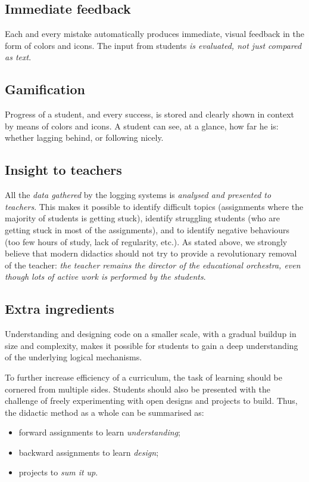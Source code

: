 \subsection{Immediate feedback}
Each and every mistake automatically produces immediate, visual feedback in the form of colors and icons. The input from students \textit{is evaluated, not just compared as text}.

\subsection{Gamification}
Progress of a student, and every success, is stored and clearly shown in context by means of colors and icons. A student can see, at a glance, how far he is: whether lagging behind, or following nicely.

\subsection{Insight to teachers}
All the \textit{data gathered} by the logging systems is \textit{analysed and presented to teachers}. This makes it possible to identify difficult topics (assignments where the majority of students is getting stuck), identify struggling students (who are getting stuck in most of the assignments), and to identify negative behaviours (too few hours of study, lack of regularity, etc.). As stated above, we strongly believe that modern didactics should not try to provide a revolutionary removal of the teacher: \textit{the teacher remains the director of the educational orchestra, even though lots of active work is performed by the students}.

\subsection{Extra ingredients}
Understanding and designing code on a smaller scale, with a gradual buildup in size and complexity, makes it possible for students to gain a deep understanding of the underlying logical mechanisms.

To further increase efficiency of a curriculum, the task of learning should be cornered from multiple sides. Students should also be presented with the challenge of freely experimenting with open designs and projects to build. Thus, the didactic method as a whole can be summarised as:

\begin{itemize}[noitemsep]
	\item forward assignments to learn \textit{understanding};
	\item backward assignments to learn \textit{design};
	\item projects to \textit{sum it up}.
\end{itemize}

